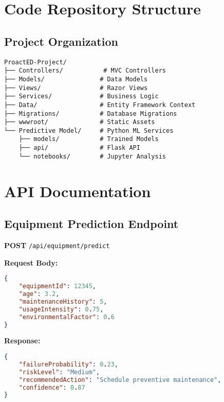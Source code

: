 \documentclass[12pt,a4paper]{report}
\begin{document}
\chapter{Code Repository Structure}

\section{Project Organization}
\begin{verbatim}
ProactED-Project/
├── Controllers/           # MVC Controllers
├── Models/               # Data Models
├── Views/                # Razor Views  
├── Services/             # Business Logic
├── Data/                 # Entity Framework Context
├── Migrations/           # Database Migrations
├── wwwroot/              # Static Assets
└── Predictive Model/     # Python ML Services
    ├── models/           # Trained Models
    ├── api/              # Flask API
    └── notebooks/        # Jupyter Analysis
\end{verbatim}

\chapter{API Documentation}

\section{Equipment Prediction Endpoint}

\textbf{POST} \texttt{/api/equipment/predict}

\textbf{Request Body:}
\begin{lstlisting}[language=json]
{
    "equipmentId": 12345,
    "age": 3.2,
    "maintenanceHistory": 5,
    "usageIntensity": 0.75,
    "environmentalFactor": 0.6
}
\end{lstlisting}

\textbf{Response:}
\begin{lstlisting}[language=json]
{
    "failureProbability": 0.23,
    "riskLevel": "Medium",
    "recommendedAction": "Schedule preventive maintenance",
    "confidence": 0.87
}
\end{lstlisting}
\end{document}
